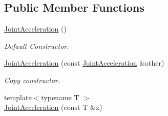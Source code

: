 \subsection*{Public Member Functions}
\begin{DoxyCompactItemize}
\item 
\hyperlink{classow__core_1_1JointAcceleration_aa5de527dfa135e326e6686fa812b5e83}{Joint\+Acceleration} ()\hypertarget{classow__core_1_1JointAcceleration_aa5de527dfa135e326e6686fa812b5e83}{}\label{classow__core_1_1JointAcceleration_aa5de527dfa135e326e6686fa812b5e83}

\begin{DoxyCompactList}\small\item\em Default Constructor. \end{DoxyCompactList}\item 
\hyperlink{classow__core_1_1JointAcceleration_a2c23287b92cf9367360ef625ce931165}{Joint\+Acceleration} (const \hyperlink{classow__core_1_1JointAcceleration}{Joint\+Acceleration} \&other)\hypertarget{classow__core_1_1JointAcceleration_a2c23287b92cf9367360ef625ce931165}{}\label{classow__core_1_1JointAcceleration_a2c23287b92cf9367360ef625ce931165}

\begin{DoxyCompactList}\small\item\em Copy constructor. \end{DoxyCompactList}\item 
{\footnotesize template$<$typename T $>$ }\\\hyperlink{classow__core_1_1JointAcceleration_aa12e232ac1ba3ab15a501de6c5f2789c}{Joint\+Acceleration} (const T \&x)\hypertarget{classow__core_1_1JointAcceleration_aa12e232ac1ba3ab15a501de6c5f2789c}{}\label{classow__core_1_1JointAcceleration_aa12e232ac1ba3ab15a501de6c5f2789c}


\end{DoxyCompactItemize}
